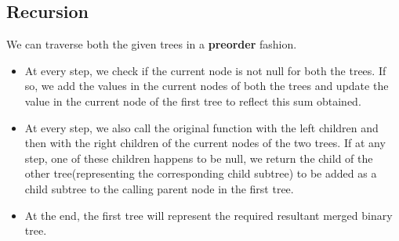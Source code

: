 \subsection{Recursion}
We can traverse both the given trees in a \textbf{preorder} fashion. 
\begin{itemize}
    \item At every step, we check if the current node is not null for both the trees. If so, we add the values in the current nodes of both the trees and update the value in the current node of the first tree to reflect this sum obtained. 
    \item At every step, we also call the original function with the left children and then with the right children of the current nodes of the two trees. If at any step, one of these children happens to be null, we return the child of the other tree(representing the corresponding child subtree) to be added as a child subtree to the calling parent node in the first tree. 
    \item At the end, the first tree will represent the required resultant merged binary tree.
\end{itemize}